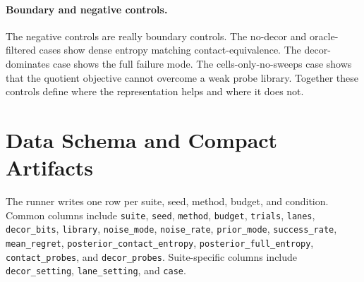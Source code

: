 \documentclass{article}
\begin{document}
\paragraph{Boundary and negative controls.}
The negative controls are really boundary controls. The no-decor and oracle-filtered cases show dense entropy matching contact-equivalence. The decor-dominates case shows the full failure mode. The cells-only-no-sweeps case shows that the quotient objective cannot overcome a weak probe library. Together these controls define where the representation helps and where it does not.

\section{Data Schema and Compact Artifacts}

The runner writes one row per suite, seed, method, budget, and condition. Common columns include \texttt{suite}, \texttt{seed}, \texttt{method}, \texttt{budget}, \texttt{trials}, \texttt{lanes}, \texttt{decor\_bits}, \texttt{library}, \texttt{noise\_mode}, \texttt{noise\_rate}, \texttt{prior\_mode}, \texttt{success\_rate}, \texttt{mean\_regret}, \texttt{posterior\_contact\_entropy}, \texttt{posterior\_full\_entropy}, \texttt{contact\_probes}, and \texttt{decor\_probes}. Suite-specific columns include \texttt{decor\_setting}, \texttt{lane\_setting}, and \texttt{case}.

\begin{table}[h]
\centering
\caption{Compact artifact schema. The first column gives the suite name rather than the full filename to avoid formatting artifacts; the CSV files use the corresponding suite names under \texttt{results/full\_scale/}.}
\label{tab:schema}
\end{table}
\end{document}
